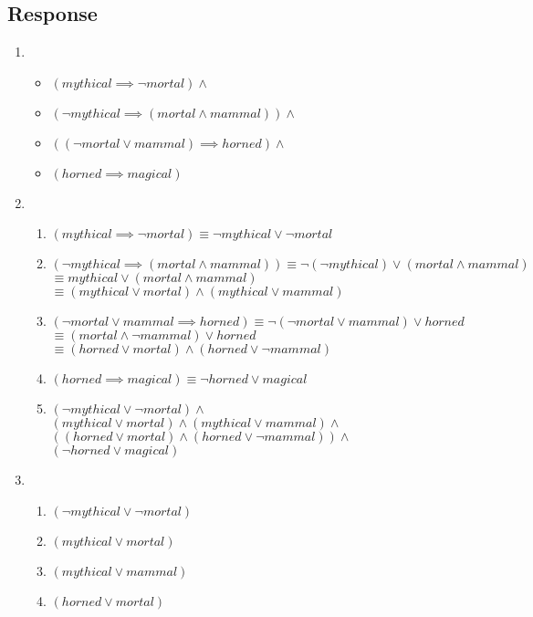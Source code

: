 \documentclass[13pt]{article}
\begin{document}
\subsection*{Response}
\begin{enumerate}[label=(\alph*)]
\item
  \begin{itemize}
  \item $(mythical \implies \neg mortal) \land$
  \item $(\neg mythical \implies (mortal \land mammal)) \land$
  \item $((\neg mortal \lor mammal) \implies horned) \land$
  \item $(horned \implies magical)$
  \end{itemize}
\item
  \begin{enumerate}
  \item $(mythical \implies \neg mortal) \equiv \neg mythical \lor \neg mortal$
  \item $(\neg mythical \implies (mortal \land mammal)) \equiv \neg (\neg mythical) \lor (mortal \land mammal)$ \\
    $\equiv mythical \lor (mortal \land mammal)$ \\
    $\equiv (mythical \lor mortal) \land (mythical \lor mammal)$
  \item $(\neg mortal \lor mammal \implies horned) \equiv \neg(\neg mortal \lor mammal) \lor horned$ \\
    $\equiv (mortal \land \neg mammal) \lor horned$ \\
    $\equiv (horned \lor mortal) \land (horned \lor \neg mammal)$
  \item $(horned \implies magical) \equiv \neg horned \lor magical$
  \item $(\neg mythical \lor \neg mortal) \land$ \\
    $(mythical \lor mortal) \land (mythical \lor mammal) \land$ \\
    $((horned \lor mortal) \land (horned \lor \neg mammal)) \land$ \\
    $(\neg horned \lor magical)$
  \end{enumerate}
\item
  \begin{enumerate}
  \item $(\neg mythical \lor \neg mortal)$
  \item $(mythical \lor mortal)$
  \item $(mythical \lor mammal)$
  \item $(horned \lor mortal)$

\end{enumerate}
\end{enumerate}
\end{document}
